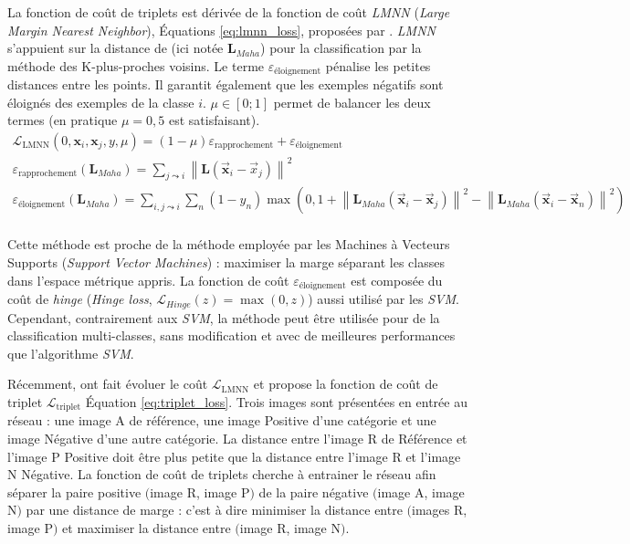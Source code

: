 La fonction de coût de triplets est dérivée de la fonction de coût \textit{LMNN} (\textit{Large Margin Nearest Neighbor}), Équations \ref{eq:lmnn_loss}, proposées par \citeauthor{weinberger_distance_2006} \cite{weinberger_distance_2006}. \textit{LMNN} s'appuient sur la distance de \citeauthor{mahalanobis_generalised_1936} \cite{mahalanobis_generalised_1936} (ici notée $\mathbf{L}_{Maha}$) pour la classification par la méthode des K-plus-proches voisins.
Le terme $\varepsilon_{\text{éloignement}}$ pénalise les petites distances entre les points. Il garantit également que les exemples négatifs sont éloignés des exemples de la classe $i$. $\mu \in [0 ; 1]$ permet de balancer les deux termes (en pratique $\mu=0,5$ est satisfaisant).
\begin{equation} \label{eq:lmnn_loss}
\begin{split}
\mathcal{L}_{\mathrm{LMNN}}(0, \mathbf{x}_i, \mathbf{x}_j, y, \mu)=(1-\mu) \varepsilon_{\text{rapprochement}} + \varepsilon_{\text{éloignement}}
\\
\varepsilon_{\text{rapprochement}}(\mathbf{L}_{Maha})=\sum_{j \leadsto i}\left\|\mathbf{L}\left(\vec{\mathbf{x}}_{i}-\vec{x}_{j}\right)\right\|^{2}
\\
\varepsilon_{\text{éloignement}}(\mathbf{L}_{Maha})=\sum_{i, j \leadsto i} \sum_{n}\left(1-y_{n}\right)\max\left(0, 1+\left\|\mathbf{L}_{Maha}\left(\vec{\mathbf{x}}_{i}-\vec{\mathbf{x}}_{j}\right)\right\|^{2}-\left\|\mathbf{L}_{Maha}\left(\vec{\mathbf{x}}_{i}-\vec{\mathbf{x}}_{n}\right)\right\|^{2}\right)
\\
\end{split}
\end{equation}

Cette méthode est proche de la méthode employée par les Machines à Vecteurs Supports (\textit{Support Vector Machines}) : maximiser la marge séparant les classes dans l'espace métrique appris.
La fonction de coût $\varepsilon_{\text{éloignement}}$ est composée du coût de \textit{hinge} (\textit{Hinge loss}, $\mathcal{L}_{Hinge}(z)=\max (0, z)$) aussi utilisé par les \textit{SVM}.
Cependant, contrairement aux \textit{SVM}, la méthode peut être utilisée pour de la classification multi-classes, sans modification et avec de meilleures performances que l'algorithme \textit{SVM}.

Récemment, \citeauthor{schroff_facenet_2015} \cite{schroff_facenet_2015} ont fait évoluer le coût $\mathcal{L}_{\mathrm{LMNN}}$ et propose la fonction de coût de triplet $\mathcal{L}_{\mathrm{triplet}}$ Équation \ref{eq:triplet_loss}.
Trois images sont présentées en entrée au réseau : une image A de référence, une image Positive d'une catégorie et une image Négative d'une autre catégorie.
La distance entre l'image R de Référence et l'image P Positive doit être plus petite que la distance entre l'image R et l'image N Négative.
La fonction de coût de triplets cherche à entrainer le réseau afin séparer la paire positive $($image R, image P$)$ de la paire négative $($image A, image N$)$ par une distance de marge : c'est à dire minimiser la distance entre $($images R, image P$)$ et maximiser la distance entre $($image R, image N$)$.

